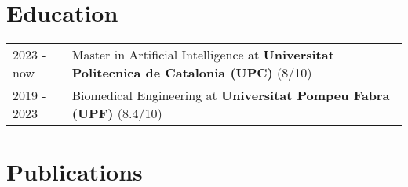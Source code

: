 \documentclass[a4paper,12pt]{article}
\begin{document}
\section{Education}
\begin{tabularx}{\linewidth}{@{}l X@{}}	
2023 - now & Master in Artificial Intelligence at \textbf{Universitat Politecnica de Catalonia (UPC)} \hfill \normalsize (8/10) \\
2019 - 2023 & Biomedical Engineering at \textbf{Universitat Pompeu Fabra (UPF)} \hfill (8.4/10) \\ 
\end{tabularx}

\section{Publications}
\begin{refsection}
\nocite{UTI2024}
\nocite{honey2023}
\nocite{wine2022}
\printbibliography[heading=none]
\end{refsection}

\vfill
{}
\end{document}
